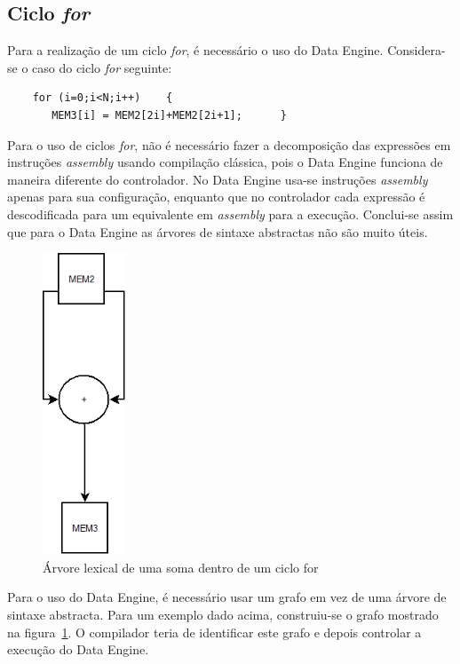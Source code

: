 \subsection{Ciclo {\it for}}
\label{subsection:Ciclo for}

Para a realização de um ciclo {\it for}, é necessário o uso do Data Engine. Considera-se o caso do ciclo {\it for} seguinte:

\begin{lstlisting}
    for (i=0;i<N;i++)    {
       MEM3[i] = MEM2[2i]+MEM2[2i+1];      }
\end{lstlisting}

Para o uso de ciclos {\it for}, não é necessário fazer a decomposição das expressões em instruções {\it assembly} usando compilação clássica, pois o Data Engine funciona de maneira diferente do controlador. No Data Engine usa-se instruções {\it assembly} apenas para sua configuração,
enquanto que no controlador cada expressão é descodificada para um equivalente em {\it assembly} para a execução. 
Conclui-se assim que para o Data Engine as árvores de sintaxe abstractas não são muito úteis.

\clearpage

\begin{figure}[!htb]
  \centering
  \includegraphics[height=90mm]{Figures/grafo2.png}
  \caption[Árvore lexical de uma soma]{Árvore lexical de uma soma dentro de um ciclo for}  
  \label{fig:Arvore_lexical_de_uma_soma_no_ciclo_for}
\end{figure}

Para o uso do Data Engine, é necessário usar um grafo em vez de uma árvore de sintaxe abstracta. Para um exemplo dado acima, construiu-se o grafo mostrado na figura~\ref{fig:Arvore_lexical_de_uma_soma_no_ciclo_for}. O compilador teria de identificar este grafo e depois controlar a execução do Data Engine. 

